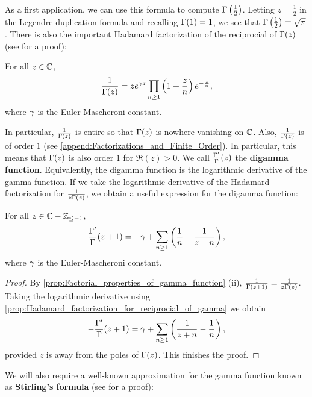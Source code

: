       As a first application, we can use this formula to compute $\Gamma\left(\frac{1}{2}\right)$. Letting $z = \frac{1}{2}$ in the Legendre duplication formula and recalling $\Gamma(1) = 1$, we see that $\Gamma\left(\frac{1}{2}\right) = \sqrt{\pi}$. There is also the important Hadamard factorization of the reciprocial of $\Gamma(z)$ (see \cite{stein2003complex} for a proof):

      \begin{proposition}\label{prop:Hadamard_factorization_for_reciprocial_of_gamma}
        For all $z \in \mathbb{C}$,
        \[
          \frac{1}{\Gamma(z)} = ze^{\gamma z}\prod_{n \ge 1}\left(1+\frac{z}{n}\right)e^{-\frac{z}{n}},
        \]
        where $\gamma$ is the Euler-Mascheroni constant.
      \end{proposition}

      In particular, $\frac{1}{\Gamma(z)}$ is entire so that $\Gamma(z)$ is nowhere vanishing on $\mathbb{C}$. Also, $\frac{1}{\Gamma(z)}$ is of order $1$ (see \cref{append:Factorizations_and_Finite_Order}). In particular, this means that $\Gamma(z)$ is also order $1$ for $\Re(z) > 0$. We call $\frac{\Gamma'}{\Gamma}(z)$ the \textbf{digamma function}. Equivalently, the digamma function is the logarithmic derivative of the gamma function. If we take the logarithmic derivative of the Hadamard factorization for $\frac{1}{z\Gamma(z)}$, we obtain a useful expression for the digamma function:

      \begin{corollary}\label{cor:logarithmic_derivative_of_gamma}
        For all $z \in \mathbb{C}-\mathbb{Z}_{\le -1}$,
        \[
          \frac{\Gamma'}{\Gamma}(z+1) = -\gamma+\sum_{n \ge 1}\left(\frac{1}{n}-\frac{1}{z+n}\right),
        \]
        where $\gamma$ is the Euler-Mascheroni constant.
      \end{corollary}
      \begin{proof}
        By \cref{prop:Factorial_properties_of_gamma_function} (ii), $\frac{1}{\Gamma(z+1)} = \frac{1}{z\Gamma(z)}$. Taking the logarithmic derivative using \cref{prop:Hadamard_factorization_for_reciprocial_of_gamma} we obtain
        \[
          -\frac{\Gamma'}{\Gamma}(z+1) = \gamma+\sum_{n \ge 1}\left(\frac{1}{z+n}-\frac{1}{n}\right),
        \]
        provided $z$ is away from the poles of $\Gamma(z)$. This finishes the proof.
      \end{proof}
      
      We will also require a well-known approximation for the gamma function known as \textbf{Stirling's formula} (see \cite{remmert1998classical} for a proof):

